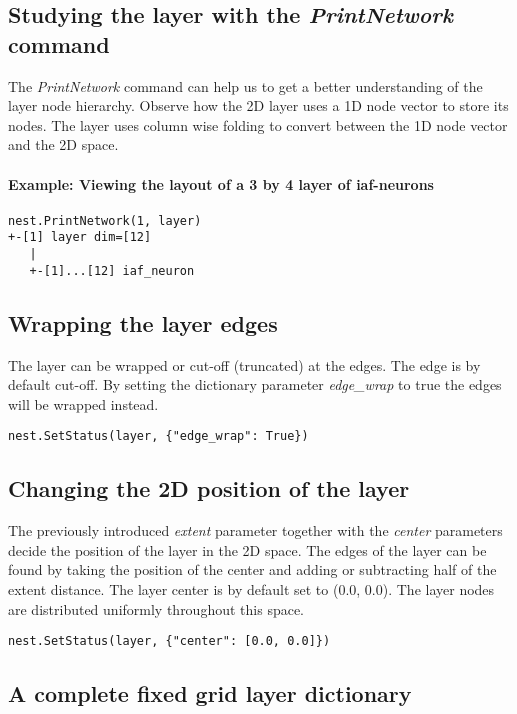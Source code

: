 \documentclass{article}
\begin{document}
\subsection{Studying the layer with the \emph{PrintNetwork} command}

The \emph{PrintNetwork} command can help us to get a better understanding of the layer node hierarchy. Observe how the 2D layer uses a 1D node vector to store its nodes. The layer uses column wise folding to convert between the 1D node vector and the 2D space.

\paragraph{Example: Viewing the layout of a 3 by 4 layer of iaf-neurons}
\begin{verbatim}
nest.PrintNetwork(1, layer)
+-[1] layer dim=[12]
   |
   +-[1]...[12] iaf_neuron
\end{verbatim}

\subsection{Wrapping the layer edges}

The layer can be wrapped or cut-off (truncated) at the edges. The edge is by default cut-off. By setting the dictionary parameter \emph{edge\_wrap} to true the edges will be wrapped instead.

\begin{verbatim}
nest.SetStatus(layer, {"edge_wrap": True})
\end{verbatim}

\subsection{Changing the 2D position of the layer}

The previously introduced \emph{extent} parameter together with the \emph{center} parameters decide the position of the layer in the 2D space. The edges of the layer can be found by taking the position of the center and adding or subtracting half of the extent distance. The layer center is by default set to (0.0, 0.0). The layer nodes are distributed uniformly throughout this space. 

\begin{verbatim}
nest.SetStatus(layer, {"center": [0.0, 0.0]})
\end{verbatim}

\subsection{A complete fixed grid layer dictionary}
\end{document}
